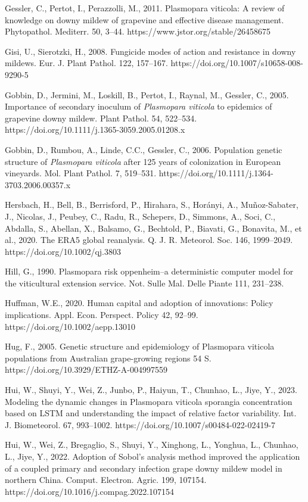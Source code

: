 \documentclass[
]{article}
\begin{document}
Gessler, C., Pertot, I., Perazzolli, M., 2011. Plasmopara viticola: A
review of knowledge on downy mildew of grapevine and effective disease
management. Phytopathol. Mediterr. 50, 3--44.
https://www.jstor.org/stable/26458675

Gisi, U., Sierotzki, H., 2008. Fungicide modes of action and resistance
in downy mildews. Eur. J. Plant Pathol. 122, 157--167.
https://doi.org/10.1007/s10658-008-9290-5

Gobbin, D., Jermini, M., Loskill, B., Pertot, I., Raynal, M., Gessler,
C., 2005. Importance of secondary inoculum of \emph{Plasmopara viticola}
to epidemics of grapevine downy mildew. Plant Pathol. 54, 522--534.
https://doi.org/10.1111/j.1365-3059.2005.01208.x

Gobbin, D., Rumbou, A., Linde, C.C., Gessler, C., 2006. Population
genetic structure of \emph{Plasmopara viticola} after 125 years of
colonization in European vineyards. Mol. Plant Pathol. 7, 519--531.
https://doi.org/10.1111/j.1364-3703.2006.00357.x

Hersbach, H., Bell, B., Berrisford, P., Hirahara, S., Horányi, A.,
Muñoz-Sabater, J., Nicolas, J., Peubey, C., Radu, R., Schepers, D.,
Simmons, A., Soci, C., Abdalla, S., Abellan, X., Balsamo, G., Bechtold,
P., Biavati, G., Bonavita, M., et al., 2020. The ERA5 global reanalysis.
Q. J. R. Meteorol. Soc. 146, 1999--2049. https://doi.org/10.1002/qj.3803

Hill, G., 1990. Plasmopara risk oppenheim--a deterministic computer
model for the viticultural extension service. Not. Sulle Mal. Delle
Piante 111, 231--238.

Huffman, W.E., 2020. Human capital and adoption of innovations: Policy
implications. Appl. Econ. Perspect. Policy 42, 92--99.
https://doi.org/10.1002/aepp.13010

Hug, F., 2005. Genetic structure and epidemiology of Plasmopara viticola
populations from Australian grape-growing regions 54 S.
https://doi.org/10.3929/ETHZ-A-004997559

Hui, W., Shuyi, Y., Wei, Z., Junbo, P., Haiyun, T., Chunhao, L., Jiye,
Y., 2023. Modeling the dynamic changes in Plasmopara viticola sporangia
concentration based on LSTM and understanding the impact of relative
factor variability. Int. J. Biometeorol. 67, 993--1002.
https://doi.org/10.1007/s00484-022-02419-7

Hui, W., Wei, Z., Bregaglio, S., Shuyi, Y., Xinghong, L., Yonghua, L.,
Chunhao, L., Jiye, Y., 2022. Adoption of Sobol's analysis method
improved the application of a coupled primary and secondary infection
grape downy mildew model in northern China. Comput. Electron. Agric.
199, 107154. https://doi.org/10.1016/j.compag.2022.107154
\end{document}
